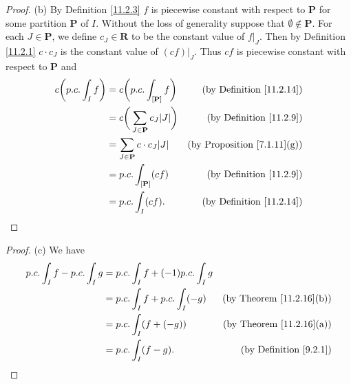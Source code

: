 \begin{proof}{(b)}
    By Definition \ref{11.2.3} \(f\) is piecewise constant with respect to \(\mathbf{P}\) for some partition \(\mathbf{P}\) of \(I\).
    Without the loss of generality suppose that \(\emptyset \notin \mathbf{P}\).
    For each \(J \in \mathbf{P}\), we define \(c_J \in \mathbf{R}\) to be the constant value of \(f|_J\).
    Then by Definition \ref{11.2.1} \(c \cdot c_J\) is the constant value of \((cf)|_J\).
    Thus \(cf\) is piecewise constant with respect to \(\mathbf{P}\) and
    \begin{align*}
        c \bigg(p.c. \int_I f\bigg) & = c \bigg(p.c. \int_{[\mathbf{P}]} f\bigg)           & \text{(by Definition \ref{11.2.14})}    \\
                                    & = c \bigg(\sum_{J \in \mathbf{P}} c_J \abs*{J}\bigg) & \text{(by Definition \ref{11.2.9})}     \\
                                    & = \sum_{J \in \mathbf{P}} c \cdot c_J \abs*{J}       & \text{(by Proposition \ref{7.1.11}(g))} \\
                                    & = p.c. \int_{[\mathbf{P}]} (c f)                     & \text{(by Definition \ref{11.2.9})}     \\
                                    & = p.c. \int_I (c f).                                 & \text{(by Definition \ref{11.2.14})}
    \end{align*}
\end{proof}

\begin{proof}{(c)}
    We have
    \begin{align*}
        p.c. \int_I f - p.c. \int_I g & = p.c. \int_I f + (-1) p.c. \int_I g                                        \\
                                      & = p.c. \int_I f + p.c. \int_I (-g)   & \text{(by Theorem \ref{11.2.16}(b))} \\
                                      & = p.c. \int_I (f + (-g))             & \text{(by Theorem \ref{11.2.16}(a))} \\
                                      & = p.c. \int_I (f - g).               & \text{(by Definition \ref{9.2.1})}
    \end{align*}
\end{proof}

